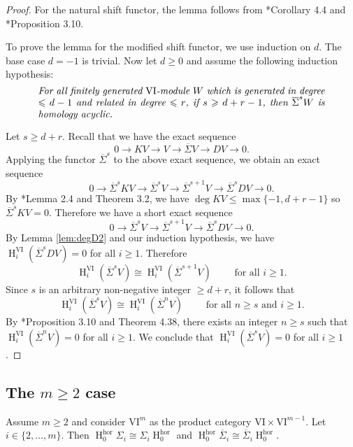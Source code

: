 \documentclass{amsart}
\numberwithin{equation}{section}
\DeclareMathOperator{\HH}{H}
\newcommand{\hor}{{\mathrm{hor}}}
\newcommand{\VI}{{\mathrm{VI}}}
\newcommand{\SSigma}{{\overline{\Sigma}}}
\begin{document}
\begin{proof}
   For the natural shift functor, the lemma follows from \cite{gl_vi}*{Corollary 4.4} and \cite{na}*{Proposition 3.10}.

   To prove the lemma for the modified shift functor, we use induction on $d$. The base case $d=-1$ is trivial. Now let $d\geqslant 0$ and assume the following induction hypothesis: 
   \begin{equation*}
      \parbox{.85\textwidth}{\it For all finitely generated $\VI$-module $W$ which is generated in degree $\leqslant d-1$ and related in degree $\leqslant r$, if $s \geqslant d+r-1$, then $\SSigma^s W$ is homology acyclic.}
   \end{equation*}
   
   Let $s\geqslant d+r$. Recall that we have the exact sequence 
   \[ 0 \to KV \to V \to \SSigma V \to DV \to 0. \]
   Applying the functor $\SSigma^s$ to the above exact sequence, we obtain an exact sequence 
   \[ 0 \to \SSigma^s KV \to \SSigma^s V \to \SSigma^{s+1} V \to \SSigma^s DV \to 0. \]
   By \cite{gl_vi}*{Lemma 2.4 and Theorem 3.2}, we have $\deg KV \leqslant \max\{-1, d+r-1\}$ so $\SSigma^s KV=0$.  Therefore we have a short exact sequence 
   \[ 0 \to \SSigma^s V \to \SSigma^{s+1} V \to \SSigma^s DV \to 0. \]
   By Lemma \ref{lem:degD2} and our induction hypothesis, we have $\HH^{\VI}_i(\SSigma^s DV)=0$ for all $i\geqslant 1$. Therefore 
   \[ \HH^{\VI}_i(\SSigma^s V) \cong \HH^{\VI}_i(\SSigma^{s+1} V) \qquad \mbox{ for all }i\geqslant 1. \]
   Since $s$ is an arbitrary non-negative integer $\geqslant d+r$, it follows that 
   \[ \HH^{\VI}_i(\SSigma^s V) \cong \HH^{\VI}_i(\SSigma^n V) \qquad \mbox{ for all }n\geqslant s\mbox{ and }i\geqslant 1.\]  
   By \cite{na}*{Proposition 3.10 and Theorem 4.38}, there exists an integer $n\geqslant s$ such that $\HH^{\VI}_i(\SSigma^n V) = 0$ for all $i\geqslant 1$. We conclude that $\HH^{\VI}_i(\SSigma^s V)=0$ for all $i\geqslant 1$.
\end{proof}


\subsection{The $m\geqslant 2$ case}

\begin{lemma} \label{lem: hor and shift commute}
   Assume $m\geqslant 2$ and consider $\VI^m$ as the product category $\VI \times \VI^{m-1}$. Let $i\in\{2, \ldots, m\}$. Then $\HH_0^{\hor} \Sigma_i \cong \Sigma_i \HH_0^{\hor}$ and $\HH_0^{\hor} \SSigma_i \cong \SSigma_i \HH_0^{\hor}$.  
\end{lemma}
\end{document}
